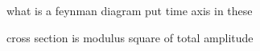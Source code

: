 what is a feynman diagram
put time axis in these

cross section is modulus square of total amplitude
